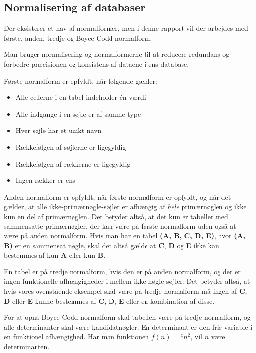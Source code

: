 {\newpage
\subsection{Normalisering af databaser}
\label{bilag:normalisering}
Der eksisterer et hav af normalformer, men i denne rapport vil der arbejdes med første, anden, tredje og Boyce-Codd normalform.

Man bruger normalisering og normalformerne til at reducere redundans og forbedre præcisionen og konsistens af dataene i ens database.

Første normalform er opfyldt, når følgende gælder:
\begin{itemize}
    \item Alle cellerne i en tabel indeholder én værdi
    \item Alle indgange i en søjle er af samme type
    \item Hver søjle har et unikt navn
    \item Rækkefølgen af søjlerne er ligegyldig
    \item Rækkefølgen af rækkerne er ligegyldig
    \item Ingen rækker er ens
\end{itemize}

Anden normalform er opfyldt, når første normalform er opfyldt, og når det gælder, at alle ikke-primærnøgle-søjler er afhængig af \textit{hele} primærnøglen og ikke kun en del af primærnøglen.
Det betyder altså, at det kun er tabeller med sammensatte primærnøgler, der kan være på første normalform uden også at være på anden normalform. Hvis man har en tabel \textbf{(\underline{A}, \underline{B}, C, D, E)}, hvor \textbf{(A, B)} er en sammensat nøgle, skal det altså gælde at \textbf{C}, \textbf{D} og \textbf{E} ikke kan bestemmes af kun \textbf{A} eller kun \textbf{B}.

En tabel er på tredje normalform, hvis den er på anden normalform, og der er ingen funktionelle afhængigheder i mellem ikke-nøgle-søjler.
Det betyder altså, at hvis vores ovenstående eksempel skal være på tredje normalform må ingen af \textbf{C}, \textbf{D} eller \textbf{E} kunne bestemmes af \textbf{C}, \textbf{D}, \textbf{E} eller en kombination af disse.

For at opnå Boyce-Codd normalform skal tabellen være på tredje normalform, og alle determinanter skal være kandidatnøgler.
En determinant er den frie variable i en funktionel afhængighed. Har man funktionen \(f(n) = 5n^2 \), vil \(n\) være determinanten.\cite{database}

}

